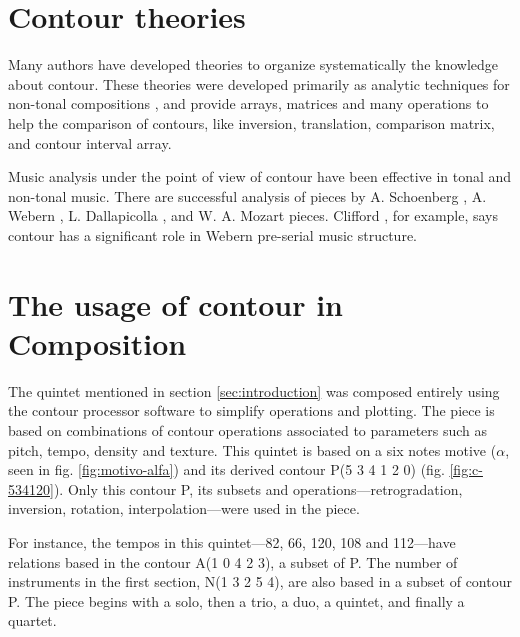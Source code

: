 \section{Contour theories}
\label{sec:contour-theories}

Many authors
\cite{friedmann85:methodology,friedmann87:response,morris87:composition,morris93:directions,marvin.ea87:relating,marvin88:generalized,marvin.ea95:generalization,polansky.ea92:possible,quinn97:fuzzy,clifford95:contour,beard03:contour}
have developed theories to organize systematically the knowledge about
contour. These theories were developed primarily as analytic
techniques for non-tonal compositions \cite{beard03:contour}, and
provide arrays, matrices and many operations to help the comparison of
contours, like inversion, translation, comparison matrix, and contour
interval array.

Music analysis under the point of view of contour have been effective
in tonal and non-tonal music. There are successful analysis of pieces
by A. Schoenberg \cite{friedmann85:methodology}, A. Webern
\cite{clifford95:contour}, L. Dallapicolla
\cite{marvin88:generalized}, and W. A. Mozart \cite{beard03:contour}
pieces. Clifford \cite{clifford95:contour}, for example, says contour
has a significant role in Webern pre-serial music structure.

\section{The usage of contour in Composition}
\label{sec:contour-composition}

The quintet mentioned in section \ref{sec:introduction} was composed
entirely using the contour processor software to simplify operations
and plotting. The piece is based on combinations of contour operations
associated to parameters such as pitch, tempo, density and texture.
This quintet is based on a six notes motive ($\alpha$, seen in fig.
\ref{fig:motivo-alfa}) and its derived contour P(5 3 4 1 2 0) (fig.
\ref{fig:c-534120}). Only this contour P, its subsets and
operations---retrogradation, inversion, rotation, interpolation---were
used in the piece.

For instance, the tempos in this quintet---82, 66, 120, 108 and
112---have relations based in the contour A(1 0 4 2 3), a subset of P.
The number of instruments in the first section, N(1 3 2 5 4), are also
based in a subset of contour P. The piece begins with a solo, then a
trio, a duo, a quintet, and finally a quartet.

